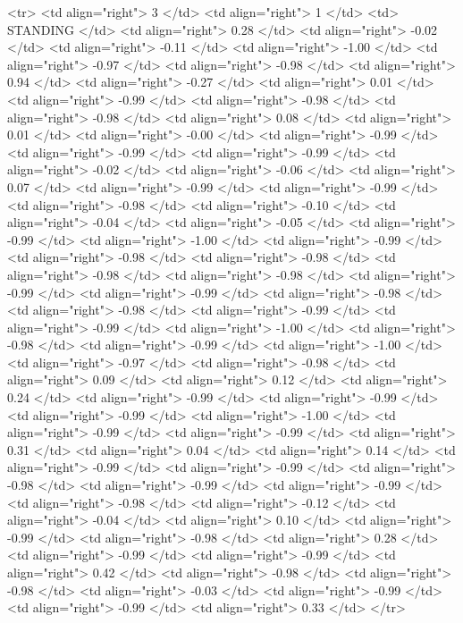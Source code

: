   <tr> <td align="right"> 3 </td> <td align="right">   1 </td> <td> STANDING </td> <td align="right"> 0.28 </td> <td align="right"> -0.02 </td> <td align="right"> -0.11 </td> <td align="right"> -1.00 </td> <td align="right"> -0.97 </td> <td align="right"> -0.98 </td> <td align="right"> 0.94 </td> <td align="right"> -0.27 </td> <td align="right"> 0.01 </td> <td align="right"> -0.99 </td> <td align="right"> -0.98 </td> <td align="right"> -0.98 </td> <td align="right"> 0.08 </td> <td align="right"> 0.01 </td> <td align="right"> -0.00 </td> <td align="right"> -0.99 </td> <td align="right"> -0.99 </td> <td align="right"> -0.99 </td> <td align="right"> -0.02 </td> <td align="right"> -0.06 </td> <td align="right"> 0.07 </td> <td align="right"> -0.99 </td> <td align="right"> -0.99 </td> <td align="right"> -0.98 </td> <td align="right"> -0.10 </td> <td align="right"> -0.04 </td> <td align="right"> -0.05 </td> <td align="right"> -0.99 </td> <td align="right"> -1.00 </td> <td align="right"> -0.99 </td> <td align="right"> -0.98 </td> <td align="right"> -0.98 </td> <td align="right"> -0.98 </td> <td align="right"> -0.98 </td> <td align="right"> -0.99 </td> <td align="right"> -0.99 </td> <td align="right"> -0.98 </td> <td align="right"> -0.98 </td> <td align="right"> -0.99 </td> <td align="right"> -0.99 </td> <td align="right"> -1.00 </td> <td align="right"> -0.98 </td> <td align="right"> -0.99 </td> <td align="right"> -1.00 </td> <td align="right"> -0.97 </td> <td align="right"> -0.98 </td> <td align="right"> 0.09 </td> <td align="right"> 0.12 </td> <td align="right"> 0.24 </td> <td align="right"> -0.99 </td> <td align="right"> -0.99 </td> <td align="right"> -0.99 </td> <td align="right"> -1.00 </td> <td align="right"> -0.99 </td> <td align="right"> -0.99 </td> <td align="right"> 0.31 </td> <td align="right"> 0.04 </td> <td align="right"> 0.14 </td> <td align="right"> -0.99 </td> <td align="right"> -0.99 </td> <td align="right"> -0.98 </td> <td align="right"> -0.99 </td> <td align="right"> -0.99 </td> <td align="right"> -0.98 </td> <td align="right"> -0.12 </td> <td align="right"> -0.04 </td> <td align="right"> 0.10 </td> <td align="right"> -0.99 </td> <td align="right"> -0.98 </td> <td align="right"> 0.28 </td> <td align="right"> -0.99 </td> <td align="right"> -0.99 </td> <td align="right"> 0.42 </td> <td align="right"> -0.98 </td> <td align="right"> -0.98 </td> <td align="right"> -0.03 </td> <td align="right"> -0.99 </td> <td align="right"> -0.99 </td> <td align="right"> 0.33 </td> </tr>
